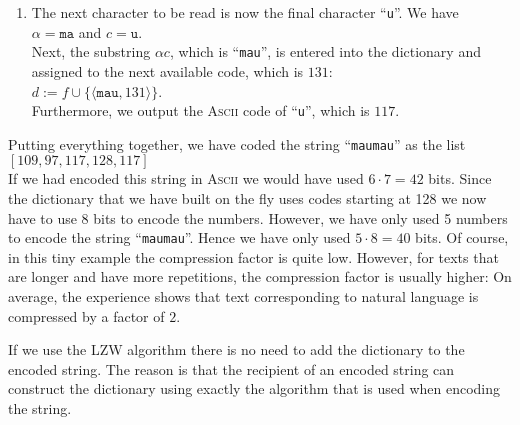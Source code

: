 \begin{enumerate}
\item The next character to be read is now the final character ``\texttt{u}''.  We have
      \\[0.2cm]
      \hspace*{1.3cm}
      $\alpha = \mathtt{ma}$ \quad and \quad $c = \mathtt{u}$.
      \\[0.2cm]
      Next, the substring $\alpha c$, which is ``\texttt{mau}'', is entered into the dictionary and
      assigned to the next available code, which is $131$:
      \\[0.2cm]
      \hspace*{1.3cm}
      $d \mathtt{:=} f \cup \{\langle \mathtt{mau}, 131 \rangle\}$.
      \\[0.2cm]
      Furthermore, we output the \textsc{Ascii} code of ``\texttt{u}'', which is $117$.
\end{enumerate} 
Putting everything together, we have coded the string ``\texttt{maumau}'' as the list
\\[0.2cm]
\hspace*{1.3cm}
$[109,97,117,128,117]$
\\[0.2cm]
If we had encoded this string in \textsc{Ascii} we would have used $6 \cdot 7 = 42$ bits.  Since the
dictionary that we have built on the fly uses codes starting at 128 we now have to use 8 bits to
encode the numbers.  However, we have only used 5 numbers to encode the string ``\texttt{maumau}''.
Hence we have only used $5 \cdot 8 = 40$ bits.   Of course, in this tiny example the compression
factor is quite low.  However, for texts that are longer and have more repetitions, the compression
factor is usually higher: On average, the experience shows that text corresponding to natural
language is compressed by a factor of $2$.

If we use the LZW algorithm there is no need to add the dictionary to the encoded string.  The
reason is that the recipient of an encoded string can construct the dictionary using exactly the
algorithm that is used when encoding the string.

